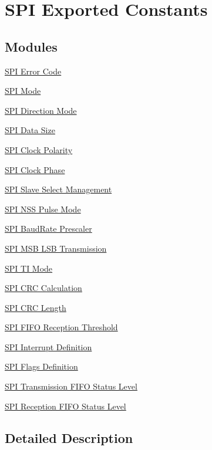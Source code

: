 \hypertarget{group___s_p_i___exported___constants}{}\section{S\+PI Exported Constants}
\label{group___s_p_i___exported___constants}
\subsection*{Modules}
\begin{DoxyCompactItemize}
\item 
\hyperlink{group___s_p_i___error___code}{S\+P\+I Error Code}
\item 
\hyperlink{group___s_p_i___mode}{S\+P\+I Mode}
\item 
\hyperlink{group___s_p_i___direction}{S\+P\+I Direction Mode}
\item 
\hyperlink{group___s_p_i___data___size}{S\+P\+I Data Size}
\item 
\hyperlink{group___s_p_i___clock___polarity}{S\+P\+I Clock Polarity}
\item 
\hyperlink{group___s_p_i___clock___phase}{S\+P\+I Clock Phase}
\item 
\hyperlink{group___s_p_i___slave___select__management}{S\+P\+I Slave Select Management}
\item 
\hyperlink{group___s_p_i___n_s_s_p___mode}{S\+P\+I N\+S\+S Pulse Mode}
\item 
\hyperlink{group___s_p_i___baud_rate___prescaler}{S\+P\+I Baud\+Rate Prescaler}
\item 
\hyperlink{group___s_p_i___m_s_b___l_s_b__transmission}{S\+P\+I M\+S\+B L\+S\+B Transmission}
\item 
\hyperlink{group___s_p_i___t_i__mode}{S\+P\+I T\+I Mode}
\item 
\hyperlink{group___s_p_i___c_r_c___calculation}{S\+P\+I C\+R\+C Calculation}
\item 
\hyperlink{group___s_p_i___c_r_c__length}{S\+P\+I C\+R\+C Length}
\item 
\hyperlink{group___s_p_i___f_i_f_o__reception__threshold}{S\+P\+I F\+I\+F\+O Reception Threshold}
\item 
\hyperlink{group___s_p_i___interrupt__definition}{S\+P\+I Interrupt Definition}
\item 
\hyperlink{group___s_p_i___flags__definition}{S\+P\+I Flags Definition}
\item 
\hyperlink{group___s_p_i__transmission__fifo__status__level}{S\+P\+I Transmission F\+I\+F\+O Status Level}
\item 
\hyperlink{group___s_p_i__reception__fifo__status__level}{S\+P\+I Reception F\+I\+F\+O Status Level}
\end{DoxyCompactItemize}


\subsection{Detailed Description}
